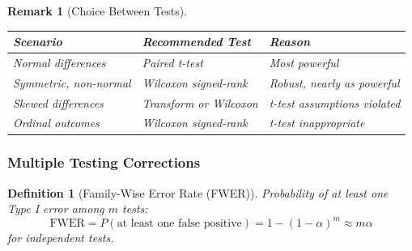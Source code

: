 \documentclass{article}
\newtheorem{definition}{Definition}
\newtheorem{remark}{Remark}
\begin{document}
\begin{remark}[Choice Between Tests]
\begin{center}
\begin{tabular}{|l|l|l|}
\hline
\textbf{Scenario} & \textbf{Recommended Test} & \textbf{Reason} \\
\hline
Normal differences & Paired t-test & Most powerful \\
Symmetric, non-normal & Wilcoxon signed-rank & Robust, nearly as powerful \\
Skewed differences & Transform or Wilcoxon & t-test assumptions violated \\
Ordinal outcomes & Wilcoxon signed-rank & t-test inappropriate \\
\hline
\end{tabular}
\end{center}
\end{remark}

\subsubsection{Multiple Testing Corrections}

\begin{definition}[Family-Wise Error Rate (FWER)]
Probability of at least one Type I error among $m$ tests:
\begin{equation}
\text{FWER} = P(\text{at least one false positive}) = 1 - (1-\alpha)^m \approx m\alpha
\end{equation}
for independent tests.
\end{definition}
\end{document}
